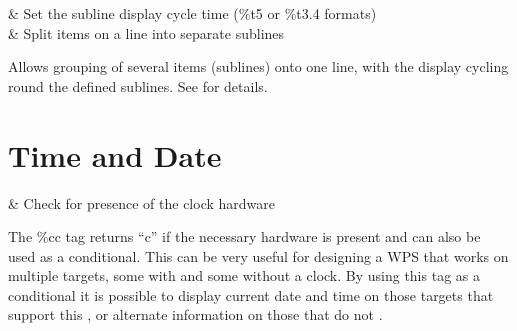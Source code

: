 \begin{tagmap}
    & Set the subline display cycle time (\%t5 or \%t3.4 formats) \\
\config{;}
    & Split items on a line into separate sublines \\
\end{tagmap}

Allows grouping of several items (sublines) onto one line, with the
display cycling round the defined sublines. See
 for details. 


\section{Time and Date}
    \begin{tagmap}
                & Check for presence of the clock hardware\\
    \end{tagmap}
The \%cc tag returns ``c'' if the necessary hardware is present and can also be
used as a conditional. This can be very useful for designing a WPS that works on
multiple targets, some with and some without a clock. By using this tag as a
conditional it is possible to display current date and time on those targets that
support this
,
or alternate information on those that do not
%
.

